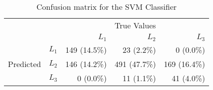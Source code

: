 \begin{table}
  \centering
    \caption{Confusion matrix for the SVM Classifier}
    \label{tab:confusion_matrix_svc}
    \begin{tabular}{rrrrr}
      \toprule
      & &\multicolumn{3}{c}{True Values}\\
      & & ${L_1}$ & ${L_2}$ & ${L_3}$ \\
      \multirow{3}{*}{Predicted} & ${L_1}$ & 149 (14.5\%) & 23 (2.2\%) & 0 (0.0\%) \\
      & ${L_2}$ & 146 (14.2\%) & 491 (47.7\%) & 169 (16.4\%) \\
      & ${L_3}$ & 0 (0.0\%) & 11 (1.1\%) & 41 (4.0\%) \\\bottomrule
  \end{tabular}
\end{table}